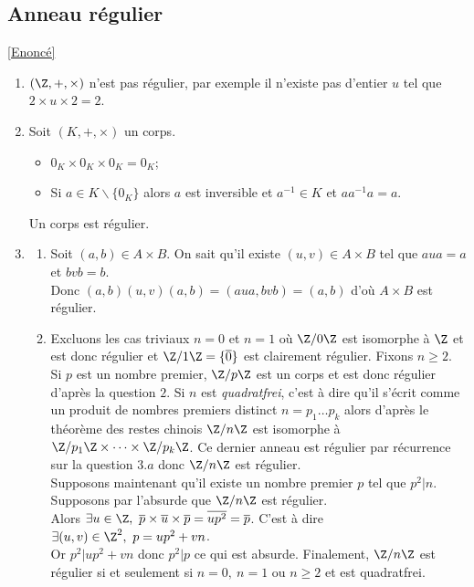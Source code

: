 \documentclass[8pt]{book}
\begin{document}
	\subsection{Anneau régulier }
	\label{Anneau régulier corrigé}
	\textcolor{blue}{\hyperref[Anneau régulier]{[Enoncé]}}\\
	\begin{enumerate}[leftmargin=*]
		\item $(\Z,+,\times)$ n'est pas régulier, par exemple il n'existe pas d'entier $u$ tel que $2\times u\times 2=2$.
		\item Soit $(K,+,\times)$ un corps.
		\begin{itemize}
			\item $0_K\times0_K\times0_K=0_K$;
			\item Si $a\in K\backslash\{0_K\}$ alors $a$ est inversible et $a^{-1}\in K$ et $aa^{-1}a=a$.
		\end{itemize}
		Un corps est régulier.
		\item \begin{enumerate}[label=\alph*.]
			\item Soit $(a,b)\in A\times B$. On sait qu'il existe $(u,v)\in A\times B$ tel que $aua=a$ et $bvb=b$.\\
			Donc $(a,b)(u,v)(a,b)=(aua,bvb)=(a,b)$ d'où $A\times B$ est régulier.
			\item Excluons les cas triviaux $n=0$ et $n=1$ où $\Z/0\Z$ est isomorphe à $\Z$ et est donc régulier et $\Z/1\Z=\{\overline 0\}$ est clairement régulier. Fixons $n\geq 2$.\\
			Si $p$ est un nombre premier, $\Z/p\Z$ est un corps et est donc régulier d'après la question $2$. Si $n$ est \textit{quadratfrei}, c'est à dire qu'il s'écrit comme un produit de nombres premiers distinct $n=p_1\dots p_k$ alors d'après le théorème des restes chinois $\Z/n\Z$ est isomorphe à $\Z/p_1\Z\times\dots\times\Z/p_k\Z$. Ce dernier anneau est régulier par récurrence sur la question $3.a$ donc $\Z/n\Z$ est régulier.\\
			Supposons maintenant qu'il existe un nombre premier $p$ tel que $p^2|n$. Supposons par l'absurde que $\Z/n\Z$ est régulier.\\
			Alors $\exists u\in \Z,\ \overline p\times\overline u\times\overline p=\overline{up^2}=\overline p$. C'est à dire $\exists (u,v)\in \Z^2,\ p=up^2+vn$.\\
			Or $p^2|up^2+vn$ donc $p^2|p$ ce qui est absurde.
			Finalement, $\Z/n\Z$ est régulier si et seulement si $n=0,\ n=1$ ou $n\geq 2$ et est quadratfrei.

\end{enumerate}
\end{enumerate}
\end{document}
